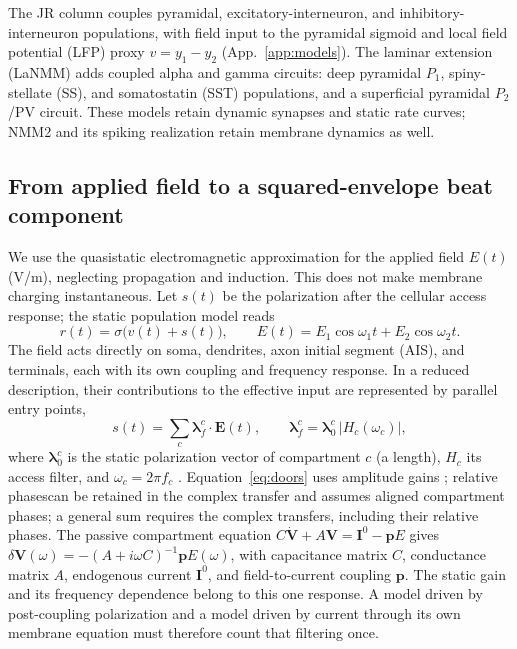 \documentclass[11pt,a4paper]{article}
\newcommand{\Sig}{\sigma}
\providecommand{\DIFaddtex}[1]{{\protect\color{blue} \sf #1}} %
\providecommand{\DIFdeltex}[1]{{\protect\color{red} \scriptsize #1}} %
\providecommand{\DIFaddbegin}{} %
\providecommand{\DIFaddend}{} %
\providecommand{\DIFdelbegin}{} %
\providecommand{\DIFdelend}{} %
\providecommand{\DIFadd}[1]{\texorpdfstring{\DIFaddtex{#1}}{#1}} %
\providecommand{\DIFdel}[1]{\texorpdfstring{\DIFdeltex{#1}}{}} %
\begin{document}
The JR column couples pyramidal, excitatory-interneuron, and inhibitory-interneuron
populations, with field input to the pyramidal sigmoid and local field potential
(LFP) proxy $v=y_1-y_2$ (App.~\ref{app:models}). The laminar extension (LaNMM)
\cite{ruffini2025cfc,sanchezTodo2023} adds coupled alpha and gamma circuits: deep
pyramidal $P_1$, spiny-stellate (SS), and somatostatin (SST) populations, and a
superficial pyramidal $P_2$/PV circuit. These models retain dynamic synapses and
static rate curves; NMM2 and its spiking realization retain membrane dynamics as well.

\subsection{From applied field to a squared-envelope beat component}\label{sec:coupling}
We use the quasistatic electromagnetic approximation for the applied field $E(t)$
(V/m), neglecting propagation and induction. This does not make membrane charging
instantaneous. Let $s(t)$ be the polarization after the cellular access response;
the static population model reads
\begin{equation}
r(t)=\Sig\!\big(v(t)+s(t)\big),\qquad
E(t)=E_1\cos\omega_1 t+E_2\cos\omega_2 t .
\label{eq:coupling}
\end{equation}
The field acts directly on soma, dendrites, axon initial segment (AIS), and terminals,
each with its own coupling and frequency response. In a reduced description, their
contributions to the effective input are represented by parallel entry points,
\begin{equation}
s(t)=\sum_c \boldsymbol\lambda^c_f\!\cdot\!\mathbf E(t),\qquad
\boldsymbol\lambda^c_f=\boldsymbol\lambda^c_0\,\lvert H_c(\omega_c)\rvert,
\label{eq:doors}
\end{equation}
where $\boldsymbol\lambda^c_0$ is the static polarization vector of compartment $c$ (a length),
$H_c$ its access filter, and $\omega_c=2\pi f_c$
\cite{ruffini2025rosetta,galangadea2023}. Equation~\eqref{eq:doors} uses amplitude
gains \DIFdelbegin \DIFdel{; relative phasescan be retained in the complex
transfer}\DIFdelend \DIFaddbegin \DIFadd{and assumes aligned compartment phases; a general sum requires the complex
transfers, including their relative phases}\DIFaddend . The passive
compartment equation $C\dot{\mathbf V}+A\mathbf V=\mathbf I^0-\mathbf pE$
\cite{ruffini2021nmm2} gives
$\delta\mathbf V(\omega)=-(A+i\omega C)^{-1}\mathbf pE(\omega)$, with capacitance
matrix $C$, conductance matrix $A$, endogenous current $\mathbf I^0$, and field-to-current
coupling $\mathbf p$. The static gain and its frequency dependence belong to this
one response. A model driven by post-coupling polarization and a model driven by
current through its own membrane equation must therefore count that filtering once.
\end{document}
